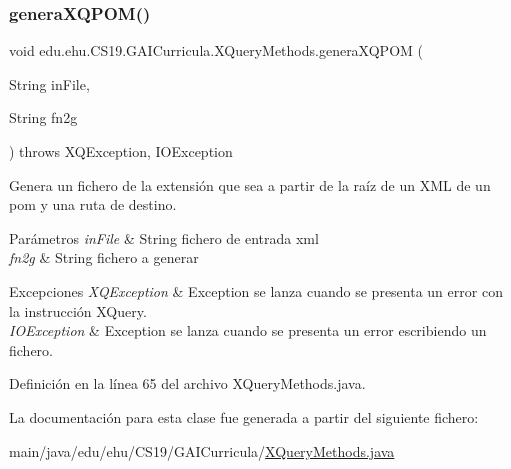\subsubsection{\texorpdfstring{generaXQPOM()}{generaXQPOM()}}
{\footnotesize\ttfamily void edu.\+ehu.\+C\+S19.\+G\+A\+I\+Curricula.\+X\+Query\+Methods.\+genera\+X\+Q\+P\+OM (\begin{DoxyParamCaption}\item[{String}]{in\+File,  }\item[{String}]{fn2g }\end{DoxyParamCaption}) throws X\+Q\+Exception, I\+O\+Exception}



Genera un fichero de la extensión que sea a partir de la raíz de un X\+ML de un pom y una ruta de destino. 


\begin{DoxyParams}{Parámetros}
{\em in\+File} & String fichero de entrada xml \\
\hline
{\em fn2g} & String fichero a generar \\
\hline
\end{DoxyParams}

\begin{DoxyExceptions}{Excepciones}
{\em X\+Q\+Exception} & Exception se lanza cuando se presenta un error con la instrucción X\+Query. \\
\hline
{\em I\+O\+Exception} & Exception se lanza cuando se presenta un error escribiendo un fichero. \\
\hline
\end{DoxyExceptions}


Definición en la línea 65 del archivo X\+Query\+Methods.\+java.



La documentación para esta clase fue generada a partir del siguiente fichero\+:\begin{DoxyCompactItemize}
\item 
main/java/edu/ehu/\+C\+S19/\+G\+A\+I\+Curricula/\mbox{\hyperlink{a00008}{X\+Query\+Methods.\+java}}\end{DoxyCompactItemize}

